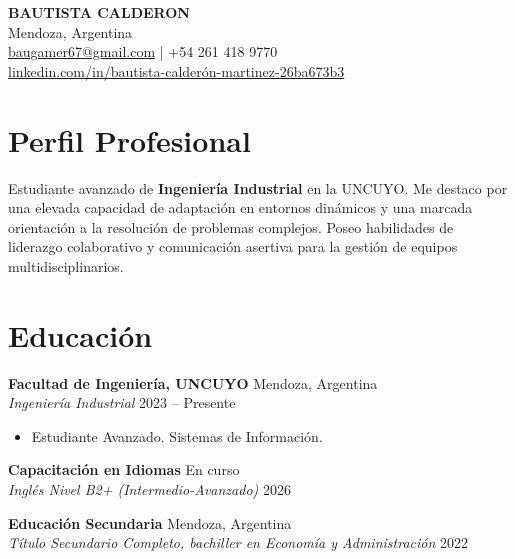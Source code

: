 \documentclass[11pt,a4paper]{article}
\begin{document}
\pagestyle{empty}

\begin{center}
    {\Huge \textbf{BAUTISTA CALDERON}} \\ \vspace{6pt}
    Mendoza, Argentina \\ \vspace{2pt}
    \href{mailto:baugamer67@gmail.com}{baugamer67@gmail.com} | +54 261 418 9770 \\ \vspace{2pt}
    \href{https://linkedin.com/in/tuperfil}{linkedin.com/in/bautista-calderón-martinez-26ba673b3} 
\end{center}

\section{Perfil Profesional}
Estudiante avanzado de \textbf{Ingeniería Industrial} en la UNCUYO. Me destaco por una elevada capacidad de adaptación en entornos dinámicos y una marcada orientación a la resolución de problemas complejos. Poseo habilidades de liderazgo colaborativo y comunicación asertiva para la gestión de equipos multidisciplinarios.

\section{Educación}
\textbf{Facultad de Ingeniería, UNCUYO} \hfill Mendoza, Argentina \\
\textit{Ingeniería Industrial} \hfill 2023 -- Presente
\begin{itemize}[noitemsep, topsep=0pt]
    \item Estudiante Avanzado.
   Sistemas de Información.
\end{itemize}

\vspace{4pt}

\textbf{Capacitación en Idiomas} \hfill En curso \\
\textit{Inglés Nivel B2+ (Intermedio-Avanzado)} \hfill 2026

\vspace{4pt}

\textbf{Educación Secundaria} \hfill Mendoza, Argentina \\
\textit{Título Secundario Completo, bachiller en Economía y Administración} \hfill 2022
\end{document}
